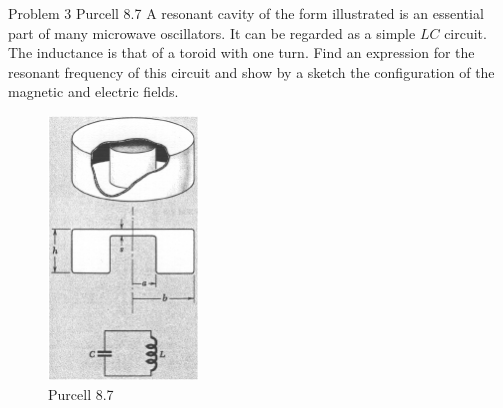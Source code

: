 \documentclass[makesolutionspdf]{esg8022pset}
\begin{document}
\begin{problem}{Problem 3 Purcell 8.7}
 A resonant cavity of the form illustrated is an essential part of many microwave oscillators. It can be regarded as a simple $LC$ circuit. The inductance is that of a toroid with one turn. Find an expression for the resonant frequency of this circuit and show by a sketch the configuration of the magnetic and electric fields.
 \begin{figure}[H]
    \centering
    \includegraphics[width = 4cm]{pu807}
    \caption{Purcell 8.7}
    \label{fig:cavity2}
  \end{figure}
  
\end{problem}
\end{document}
